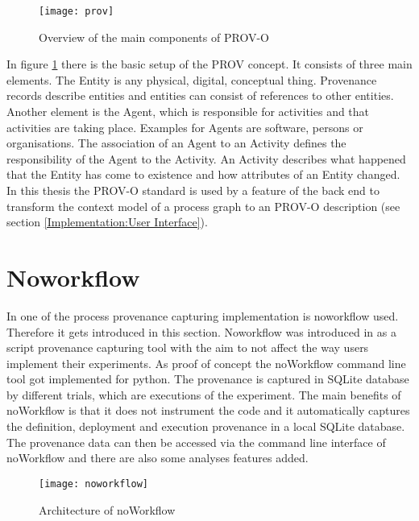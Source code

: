 \documentclass[draft,final]{vutinfth} %
\begin{document}
\begin{figure}[h]
	\centering
	\texttt{[image: prov]}
	\caption{Overview of the main components of PROV-O \cite{733f89c65e4844f9aabcae1c276a5602}}
	\label{fig:prov} %
\end{figure}

In figure \ref{fig:prov} there is the basic setup of the PROV concept. It consists of three main elements. The Entity is any physical, digital, conceptual thing. Provenance records describe entities and entities can consist of references to other entities. Another element is the Agent, which is responsible for activities and that activities are taking place. Examples for Agents are software, persons or organisations. The association of an Agent to an Activity defines the responsibility of the Agent to the Activity. An Activity describes what happened that the Entity has come to existence and how attributes of an Entity changed.\cite{f06eee9045b445be89cf07100b3ce05c} In this thesis the PROV-O standard is used by a feature of the back end to transform the context model of a process graph to an PROV-O description (see section \ref{Implementation:User Interface}). 

\section{Noworkflow}\label{Noworkflow}
In one of the process provenance capturing implementation is noworkflow used. Therefore it gets introduced in this section. Noworkflow was introduced in \cite{c9e0604becba42af96a9cb0a6f60018b} as a script provenance capturing tool with the aim to not affect the way users implement their experiments. As proof of concept the noWorkflow command line tool got implemented for python. The provenance is captured in SQLite database by different trials, which are executions of the experiment. The main benefits of noWorkflow is that it does not instrument the code and it automatically captures the definition, deployment and execution provenance in a local SQLite database. The provenance data can then be accessed via the command line interface of noWorkflow and there are also some analyses features added.\cite{c9e0604becba42af96a9cb0a6f60018b}

\begin{figure}[h]
	\centering
	\texttt{[image: noworkflow]}
	\caption{Architecture of noWorkflow \cite{c9e0604becba42af96a9cb0a6f60018b}}
	\label{fig:noworkflow} %
\end{figure}
\end{document}
